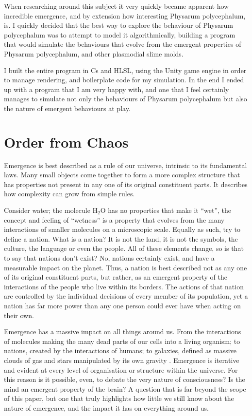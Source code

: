 \documentclass[]{report}
\begin{document}
When researching around this subject it very quickly became apparent how incredible emergence, and by extension how interesting \Gls{Physarum polycephalum}, is. I quickly decided that the best way to explore the behaviour of \Gls{Physarum polycephalum} was to attempt to model it algorithmically, building a program that would simulate the behaviours that evolve from the emergent properties of \Gls{Physarum polycephalum}, and other \glspl{plasmodial slime mold}.

I built the entire program in \Gls{Cs} and \Gls{HLSL}, using the Unity game engine in order to manage rendering, and \gls{boilerplate code} for my simulation. In the end I ended up with a program that I am very happy with, and one that I feel certainly manages to simulate not only the behaviours of \Gls{Physarum polycephalum} but also the nature of \glspl{emergent behaviour} at play.

\section{Order from Chaos}
Emergence is best described as a rule of our universe, intrinsic to its fundamental laws. Many small objects come together to form a more complex structure that has properties not present in any one of its original constituent parts. It describes how complexity can grow from simple rules.

Consider water; the molecule H$_2$O has no properties that make it “wet”, the concept and feeling of “wetness” is a property that evolves from the many interactions of smaller molecules on a microscopic scale. Equally as such, try to define a nation. What is a nation? It is not the land, it is not the symbols, the culture, the language or even the people. All of these elements change, so is that to say that nations don't exist? No, nations certainly exist, and have a measurable impact on the planet. Thus, a nation is best described not as any one of its original constituent parts, but rather, as an emergent property of the interactions of the people who live within its borders. The actions of that nation are controlled by the individual decisions of every member of its population, yet a nation has far more power than any one person could ever have when acting on their own.

Emergence has a massive impact on all things around us. From the interactions of molecules making the many dead parts of our cells into a living organism; to nations, created by the interactions of humans; to galaxies, defined as massive clouds of gas and stars manipulated by its own gravity \cite{noauthor_galaxy_2020}. Emergence is iterative and evident at every level of organisation or structure within the universe. For this reason is it possible, even, to debate the very nature of consciousness? Is the mind an emergent property of the brain? A question that is far beyond the scope of this paper, but one that truly highlights how little we still know about the nature of emergence, and the impact it has on everything around us.
\end{document}

